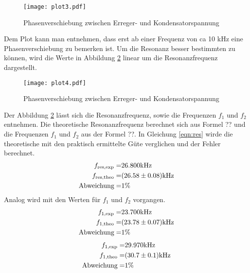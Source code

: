 \begin{figure}
  \centering
  \texttt{[image: plot3.pdf]}
  \caption{Phasenverschiebung zwischen Erreger- und Kondensatorspannung}
  \label{fig:logphi}
\end{figure}
Dem Plot kann man entnehmen, dass erst ab einer Frequenz von ca 10 kHz eine Phasenverschiebung zu bemerken ist. Um die Resonanz besser bestimmten zu können, wird die Werte in Abbildung \ref{fig:Phi} linear um die Resonanzfrequenz dargestellt. 
\begin{figure}
  \centering
  \texttt{[image: plot4.pdf]}
  \caption{Phasenverschiebung zwischen Erreger- und Kondensatorspannung}
  \label{fig:Phi}
\end{figure}
Der Abbildung \ref{fig:Phi} lässt sich die Resonanzfrequenz, sowie die Frequenzen $f_1$ und $f_2$ entnehmen. Die theoretische Resonanzfrequenz berechnet sich aus Formel ?? und die Frequenzen $f_1$ und $f_2$ aus der Formel ??. In Gleichung \ref{eqn:res} wirde die theoretische mit den praktisch ermittelte Güte verglichen und der Fehler berechnet.
\begin{eqnarray}
  f_\text{res,exp} =& 26.800 \text{kHz}			\\
  f_\text{res,theo} =& (\num{26.58 +- 0.08}) \text{kHz} \\
  \text{Abweichung} =& 1 \% 
  \label{eqn:res}
\end{eqnarray}
Analog wird mit den Werten für $f_1$ und $f_2$ vorgangen.
\begin{eqnarray}
  f_\text{1,exp} =& 23.700 \text{kHz}                 \\
  f_\text{1,theo} =& (\num{23.78 +- 0.07}) \text{kHz} \\
  \text{Abweichung} =& 1 \% 
\end{eqnarray}
\begin{eqnarray}
  f_\text{1,exp} =& 29.970 \text{kHz}                 \\
  f_\text{1,theo} =& (\num{30.7 +- 0.1}) \text{kHz} \\
  \text{Abweichung} =& 1 \% 
\end{eqnarray}

